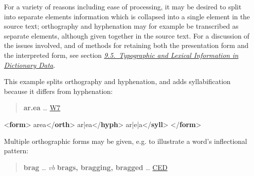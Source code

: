 For a variety of reasons including ease of processing, it may be desired to split into separate elements information which is collapsed into a single element in the source text; orthography and hyphenation may for example be transcribed as separate elements, although given together in the source text. For a discussion of the issues involved, and of methods for retaining both the presentation form and the interpreted form, see section \textit{\hyperref[DIMV]{9.5.\ Typographic and Lexical Information in Dictionary Data}}.\par
This example splits orthography and hyphenation, and adds syllabification because it differs from hyphenation:
\begin{quote}{\bfseries ar.ea} … \hyperref[DIC-W7]{W7}\end{quote}
 \par\bgroup{}\exampleFont \begin{shaded}\noindent\mbox{}{<\textbf{form}>}\mbox{}\newline 
{}area{</\textbf{orth}>}\mbox{}\newline 
{}ar|ea{</\textbf{hyph}>}\mbox{}\newline 
{}ar|e|a{</\textbf{syll}>}\mbox{}\newline 
{</\textbf{form}>}\end{shaded}\egroup\par \noindent  \par
Multiple orthographic forms may be given, e.g. to illustrate a word's inflectional pattern:
\begin{quote}{\bfseries brag} … {\itshape vb} {\bfseries brags, bragging, bragged} … \hyperref[DIC-CED]{CED}\end{quote}
